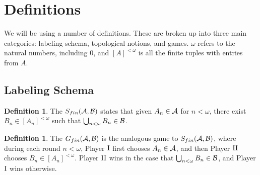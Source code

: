 \documentclass{amsart}
\theoremstyle{plain}
\theoremstyle{definition}
\newtheorem{definition}[theorem]{Definition}
\theoremstyle{remark}
\theoremstyle{plain}
\theoremstyle{definition}
\theoremstyle{remark}
\begin{document}
\section{Definitions}

We will be using a number of definitions.
These are broken up into three main categories: labeling schema, topological notions, and games.
\(\omega\) refers to the natural numbers, including \(0\), and \([A]^{<\omega}\) is all the finite tuples with entries from \(A\).

\subsection{Labeling Schema}

\begin{definition}
 The  \(S_{fin}(\mathcal{A},\mathcal{B})\) states that given \(A_n\in\mathcal{A}\) for \(n<\omega\), there exist \(B_n\in[A_n]^{<\omega}\) such that \(\bigcup_{n<\omega}B_n\in\mathcal{B}\).
\end{definition}

\begin{definition}
 The  \(G_{fin}(\mathcal{A},\mathcal{B})\) is the analogous game to \(S_{fin}(\mathcal{A},\mathcal{B})\), where during each round \(n<\omega\), Player \(\mathrm{I}\) first chooses \(A_n\in\mathcal{A}\), and then Player \(\mathrm{II}\) chooses \(B_n\in[A_n]^{<\omega}\).
 Player \(\mathrm{II}\) wins in the case that \(\bigcup_{n<\omega}B_n\in\mathcal{B}\), and Player \(\mathrm{I}\) wins otherwise.
\end{definition}
\end{document}
